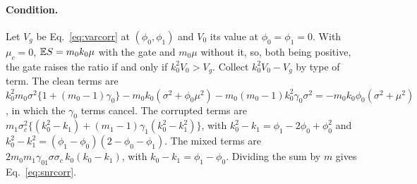 \paragraph{Condition.}
Let $V_g$ be Eq.~\eqref{eq:varcorr} at $(\phi_0,\phi_1)$ and $V_0$ its value at $\phi_0=\phi_1=0$.
With $\mu_c=0$, $\mathbb{E} S=m_0k_0\mu$ with the gate and $m_0\mu$ without it, so, both being positive, the gate raises the ratio if and only if
$k_0^2V_0>V_g$.
Collect $k_0^2V_0-V_g$ by type of term.
The clean terms are
$k_0^2m_0\sigma^2\{1+(m_0-1)\gamma_0\}-m_0k_0(\sigma^2+\phi_0\mu^2)-m_0(m_0-1)k_0^2\gamma_0\sigma^2=-m_0k_0\phi_0(\sigma^2+\mu^2)$,
in which the $\gamma_0$ terms cancel.
The corrupted terms are $m_1\sigma_c^2\{(k_0^2-k_1)+(m_1-1)\gamma_1(k_0^2-k_1^2)\}$, with $k_0^2-k_1=\phi_1-2\phi_0+\phi_0^2$ and
$k_0^2-k_1^2=(\phi_1-\phi_0)(2-\phi_0-\phi_1)$.
The mixed terms are $2m_0m_1\gamma_{01}\sigma\sigma_c\,k_0(k_0-k_1)$, with $k_0-k_1=\phi_1-\phi_0$.
Dividing the sum by $m$ gives Eq.~\eqref{eq:snrcorr}.

